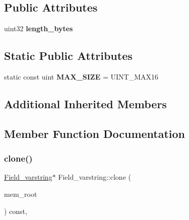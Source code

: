 \subsection*{Public Attributes}
\begin{DoxyCompactItemize}
\item 
\mbox{\label{classField__varstring_ace52abdc4c5b4ac0791b7b2b570b0425}} 
uint32 {\bfseries length\+\_\+bytes}
\end{DoxyCompactItemize}
\subsection*{Static Public Attributes}
\begin{DoxyCompactItemize}
\item 
\mbox{\label{classField__varstring_a31c371d28030ac1684af0e9f2660b581}} 
static const uint {\bfseries M\+A\+X\+\_\+\+S\+I\+ZE} = U\+I\+N\+T\+\_\+\+M\+A\+X16
\end{DoxyCompactItemize}
\subsection*{Additional Inherited Members}


\subsection{Member Function Documentation}
\mbox{\label{classField__varstring_a173eea084a6a181604892d97a2e7fee1}} 
\subsubsection{\texorpdfstring{clone()}{clone()}\hspace{0.1cm}{\footnotesize\ttfamily [1/2]}}
{\footnotesize\ttfamily \mbox{\hyperlink{classField__varstring}{Field\+\_\+varstring}}$\ast$ Field\+\_\+varstring\+::clone (\begin{DoxyParamCaption}\item[{M\+E\+M\+\_\+\+R\+O\+OT $\ast$}]{mem\+\_\+root }\end{DoxyParamCaption}) const\hspace{0.3cm}{\ttfamily [inline]}, {\ttfamily [virtual]}}

